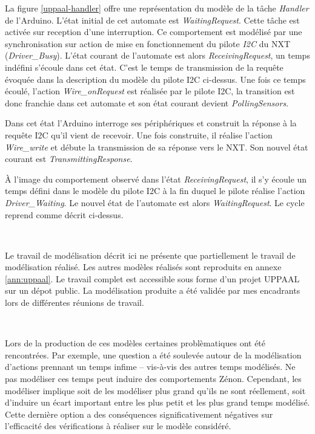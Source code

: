       La figure \ref{uppaal-handler} offre une représentation du modèle de la
      tâche {\it Handler} de l'Arduino. L'état initial de cet automate est
      {\it WaitingRequest}. Cette tâche est activée sur reception
      d'une interruption. Ce comportement est modélisé par une synchronisation
      sur action de mise en fonctionnement du pilote {\it I2C} du NXT
      ({\it Driver\_Busy}). L'état courant de l'automate est alors
      {\it ReceivingRequest}, un temps indéfini s'écoule dans cet état. C'est le
      temps de transmission de la requête évoquée dans la description du modèle
      du pilote I2C ci-dessus. Une fois ce temps écoulé, l'action
      {\it Wire\_onRequest} est réalisée par le pilote I2C, la transition est
      donc franchie dans cet automate et son état courant devient
      {\it PollingSensors}.
      
      Dans cet état l'Arduino interroge ses périphériques et construit la
      réponse à la requête I2C qu'il vient de recevoir. Une fois construite, il
      réalise l'action {\it Wire\_write} et débute la transmission de sa
      réponse vers le NXT. Son nouvel état courant est {\it TransmittingResponse}.
      
      À l'image du comportement observé dans l'état {\it ReceivingRequest}, il
      s'y écoule un temps défini dans le modèle du pilote I2C à la fin duquel
      le pilote réalise l'action {\it Driver\_Waiting}. Le nouvel état de
      l'automate est alors {\it WaitingRequest}. Le cycle reprend comme décrit
      ci-dessus.

      ~
      
      Le travail de modélisation décrit ici ne présente que partiellement le
      travail de modélisation réalisé. Les autres modèles réalisés sont reproduits en annexe
      \ref{ann:uppaal}. Le travail complet est accessible sous forme d'un projet
      UPPAAL sur un dépot public\footnotemark. La modélisation produite a été
      validée par mes encadrants lors de différentes réunions de travail.
      
      ~

      Lors de la production de ces modèles certaines problèmatiques ont été
      rencontrées. Par exemple, une question a été soulevée autour de la
      modélisation d'actions prennant un temps infime -- vis-à-vis des autres temps
      modélisés. Ne pas modéliser ces temps peut induire des comportements
      Zénon. Cependant, les modéliser implique soit de les modéliser plus grand
      qu'ils ne sont réellement, soit d'induire un écart important entre
      les plus petit et les plus grand temps modélisé. Cette dernière option a
      des conséquences significativement négatives sur l'efficacité des
      vérifications à réaliser sur le modèle considéré.
                  
